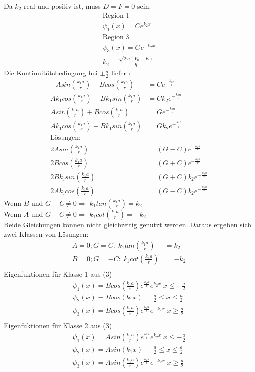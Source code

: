 \documentclass[10pt,a4paper]{article}
\begin{document}
Da $k_2$ real und positiv ist, muss $D=F=0$ sein.
\begin{align}
\text{Region 1}\\
\psi_1(x)=Ce^{k_2x}\\
\text{Region 3}\\
\psi_3(x)=Ge^{-k_2x}\\
k_2=\frac{\sqrt{2m(V_0-E)}}{\hslash}
\end{align}
Die Kontinuitätsbedingung bei $\pm \frac{a}{2}$ liefert:
\begin{align}
-Asin(\frac{k_1a}{r}) + Bcos(\frac{k_1a}{r})&=Ce^{-\frac{k_2a}{r}}\\
Ak_1cos(\frac{k_1a}{r}) + Bk_1sin(\frac{k_1a}{r})&=Ck_2e^{-\frac{k_2a}{r}}\\
Asin(\frac{k_1a}{r}) + Bcos(\frac{k_1a}{r})&=Ge^{-\frac{k_2a}{r}}\\
Ak_1cos(\frac{k_1a}{r}) - Bk_1sin(\frac{k_1a}{r})&=Gk_2e^{-\frac{k_2a}{r}}\\
\text{Lösungen:}\\
2Asin(\frac{k_1a}{r})&=(G-C)e^{-\frac{k_2a}{r}}\\
2Bcos(\frac{k_1a}{r})&=(G+C)e^{-\frac{k_2a}{r}}\\
2Bk_1sin(\frac{k_1a}{r})&=(G+C)k_2e^{-\frac{k_2a}{r}}\\
2Ak_1cos(\frac{k_1a}{r})&=(G-C)k_2e^{-\frac{k_2a}{r}}
\end{align}
Wenn $B$ und $G+C\neq 0\Rightarrow\; k_1tan(\frac{k_1a}{r})=k_2$\\
Wenn $A$ und $G-C\neq 0\Rightarrow\; k_1cot(\frac{k_1a}{r})=-k_2$\\
Beide Gleichungen können nicht gleichzeitig genutzt werden. Daraus ergeben sich zwei Klassen von Lösungen:
\begin{align}
A=0;G=C: \; k_1tan(\frac{k_1a}{r})&= k_2\\
B=0;G=-C:\; k_1cot(\frac{k_1a}{r})&=-k_2\\
\end{align}
Eigenfuktionen für Klasse 1 aus (3)
\begin{align}
\psi_1(x)= Bcos(\frac{k_1a}{r})e^{\frac{k_2a}{r}}e^{k_2x} \; x\leq -\frac{a}{2}\\
\psi_2(x)= Bcos(k_1x)\; -\frac{a}{2} \leq x\leq \frac{a}{2}\\
\psi_3(x)= Bcos(\frac{k_1a}{r})e^{\frac{k_2a}{r}}e^{-k_2x} \; x\geq \frac{a}{2}\\
\end{align}
Eigenfuktionen für Klasse 2 aus (3)
\begin{align}
\psi_1(x)= Asin(\frac{k_1a}{r})e^{\frac{k_2a}{r}}e^{k_2x} \; x\leq -\frac{a}{2}\\
\psi_2(x)= Asin(k_1x)\; -\frac{a}{2} \leq x\leq \frac{a}{2}\\
\psi_3(x)= Asin(\frac{k_1a}{r})e^{\frac{k_2a}{r}}e^{-k_2x} \; x\geq \frac{a}{2}\\
\end{align}
\end{document}
